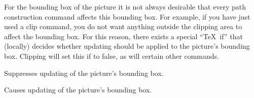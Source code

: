 For the bounding box of the picture it is not always desirable that
every path construction command affects this bounding box. For
example, if you have just used a clip command, you do not want anything
outside the clipping area to affect the bounding box. For this reason,
there exists a special ``\TeX\ if'' that (locally) decides whether
updating should be applied to the picture's bounding box. Clipping
will set this if to false, as will certain other commands.

\begin{command}{\pgf@relevantforpicturesizefalse}
  Suppresses updating of the picture's bounding box.
\end{command}

\begin{command}{\pgf@relevantforpicturesizetrue}
  Causes updating of the picture's bounding box.
\end{command}
